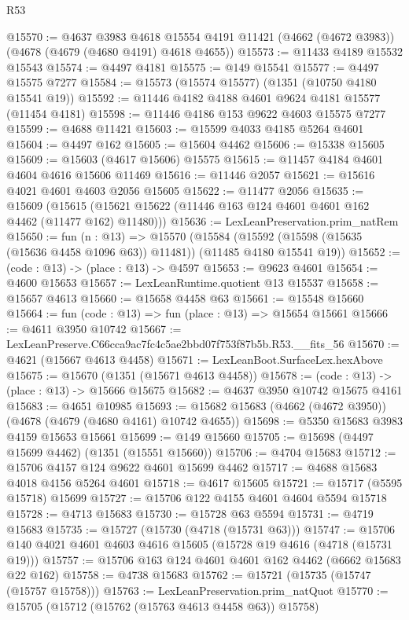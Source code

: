 \begin{lexlean}{R53}
\begin{coremodule}
@15570 := @4637
    @3983
    @4618
    @15554
    @4191
    @11421
    (@4662 (@4672 @3983))
    (@4678 (@4679 (@4680 @4191) @4618 @4655))
@15573 := @11433 @4189 @15532 @15543
@15574 := @4497 @4181
@15575 := @149 @15541
@15577 := @4497 @15575 @7277
@15584 := @15573 (@15574 @15577) (@1351 (@10750 @4180 @15541 @19))
@15592 := @11446 @4182 @4188 @4601 @9624 @4181 @15577 (@11454 @4181)
@15598 := @11446 @4186 @153 @9622 @4603 @15575 @7277
@15599 := @4688 @11421
@15603 := @15599 @4033 @4185 @5264 @4601
@15604 := @4497 @162
@15605 := @15604 @4462
@15606 := @15338 @15605
@15609 := @15603 (@4617 @15606) @15575
@15615 := @11457 @4184 @4601 @4604 @4616 @15606 @11469
@15616 := @11446 @2057
@15621 := @15616 @4021 @4601 @4603 @2056 @15605
@15622 := @11477 @2056
@15635 := @15609
    (@15615 (@15621 @15622 (@11446 @163 @124 @4601 @4601 @162 @4462 (@11477 @162) @11480)))
@15636 := LexLeanPreservation.prim_natRem
@15650 := fun (n : @13) =>
  @15570
    (@15584 (@15592 (@15598 (@15635 (@15636 @4458 @1096 @63)) @11481)) (@11485 @4180 @15541 @19))
@15652 := (code : @13) -> (place : @13) -> @4597
@15653 := @9623 @4601
@15654 := @4600 @15653
@15657 := LexLeanRuntime.quotient @13 @15537
@15658 := @15657 @4613
@15660 := @15658 @4458 @63
@15661 := @15548 @15660
@15664 := fun (code : @13) => fun (place : @13) => @15654 @15661
@15666 := @4611 @3950 @10742
@15667 := LexLeanPreserve.C66cca9ac7fc4c5ae2bbd07f753f87b5b.R53.__fits_56
@15670 := @4621 (@15667 @4613 @4458)
@15671 := LexLeanBoot.SurfaceLex.hexAbove
@15675 := @15670 (@1351 (@15671 @4613 @4458))
@15678 := (code : @13) -> (place : @13) -> @15666 @15675
@15682 := @4637 @3950 @10742 @15675 @4161
@15683 := @4651 @10985
@15693 := @15682 @15683 (@4662 (@4672 @3950)) (@4678 (@4679 (@4680 @4161) @10742 @4655))
@15698 := @5350 @15683 @3983 @4159 @15653 @15661
@15699 := @149 @15660
@15705 := @15698 (@4497 @15699 @4462) (@1351 (@15551 @15660))
@15706 := @4704 @15683
@15712 := @15706 @4157 @124 @9622 @4601 @15699 @4462
@15717 := @4688 @15683 @4018 @4156 @5264 @4601
@15718 := @4617 @15605
@15721 := @15717 (@5595 @15718) @15699
@15727 := @15706 @122 @4155 @4601 @4604 @5594 @15718
@15728 := @4713 @15683
@15730 := @15728 @63 @5594
@15731 := @4719 @15683
@15735 := @15727 (@15730 (@4718 (@15731 @63)))
@15747 := @15706 @140 @4021 @4601 @4603 @4616 @15605 (@15728 @19 @4616 (@4718 (@15731 @19)))
@15757 := @15706 @163 @124 @4601 @4601 @162 @4462 (@6662 @15683 @22 @162)
@15758 := @4738 @15683
@15762 := @15721 (@15735 (@15747 (@15757 @15758)))
@15763 := LexLeanPreservation.prim_natQuot
@15770 := @15705 (@15712 (@15762 (@15763 @4613 @4458 @63)) @15758)

\end{coremodule}
\end{lexlean}
